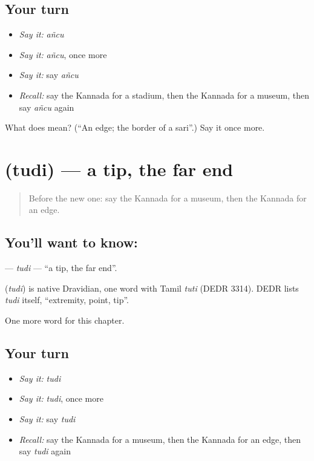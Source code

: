 \subsection*{Your turn}
\begin{itemize}
\raggedright
  \item \emph{Say it:} \emph{añcu}
  \item \emph{Say it:} \emph{añcu}, once more
  \item \emph{Say it:} say \emph{añcu}
  \item \emph{Recall:} say the Kannada for a stadium, then the Kannada for a museum, then say \emph{añcu} again
\end{itemize}

\begin{tcolorbox}[breakable,colback=teal!4,colframe=teal!35!black,title={Before you move on}]
What does  mean? (\textquotedblleft{}An edge; the border of a sari\textquotedblright{}.) Say it once more.
\end{tcolorbox}
\section[\texorpdfstring{\kn{ತುದಿ} (tudi)}{ತುದಿ (tudi)}]{ (tudi) — a tip, the far end}

\label{lesson:KA-C214-tudi}



\begin{quote}
Before the new one: say the Kannada for a museum, then the Kannada for an edge.
\end{quote}

\subsection*{You'll want to know: }
\textbf{} — \emph{tudi} — \textquotedblleft{}a tip, the far end\textquotedblright{}.

\begin{cousinweb}
\textbf{} (\emph{tudi}) is native Dravidian, one word with Tamil \emph{tuti} (DEDR 3314). DEDR lists \emph{tudi} itself, \textquotedblleft{}extremity, point, tip\textquotedblright{}.
\end{cousinweb}

\begin{grammarlens}[title={What you've built}]
One more word for this chapter.
\end{grammarlens}

\subsection*{Your turn}
\begin{itemize}
\raggedright
  \item \emph{Say it:} \emph{tudi}
  \item \emph{Say it:} \emph{tudi}, once more
  \item \emph{Say it:} say \emph{tudi}
  \item \emph{Recall:} say the Kannada for a museum, then the Kannada for an edge, then say \emph{tudi} again
\end{itemize}


